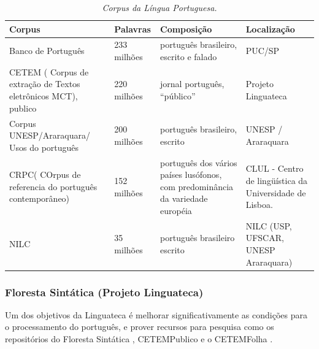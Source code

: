 \begin{table}
   \centering
   \small
   \caption{\it Corpus da Língua Portuguesa.}

    \begin{tabular}{ | p{5cm} | p{3cm} | p{3cm} | p{3cm} | }
      \hline
        \textbf{Corpus} & \textbf{Palavras} & \textbf{Composição}& \textbf{Localização}\\
        \hline
        \hline

        Banco de Português &  233 milhões & português brasileiro, escrito e falado & PUC/SP \\

        \hline

        CETEM ( Corpus de extração de Textos eletrônicos MCT), publico & 220 milhões & jornal português, ``público'' & Projeto Linguateca \\

        \hline

        Corpus UNESP/Araraquara/ Usos do português & 200 milhões & português brasileiro, escrito & UNESP / Araraquara \\

        \hline

        CRPC( COrpus de referencia do português contemporâneo) & 152 milhões & português dos vários países lusófonos, com predominância da variedade européia & CLUL - Centro de lingüística da Universidade de Lisboa. \\

        \hline

        NILC & 35 milhões & português brasileiro escrito & NILC (USP, UFSCAR, UNESP Araraquara) \\
    \hline

   \end{tabular}
   \label{tbl:corpora_port}
\end{table}

\subsubsection{Floresta Sintática (Projeto Linguateca)}
\label{sub:sub_linguateca}

Um dos objetivos da Linguateca é melhorar significativamente as condições para o processamento do português, e prover recursos para pesquisa como os repositórios do Floresta Sintática , CETEMPublico e o CETEMFolha .

